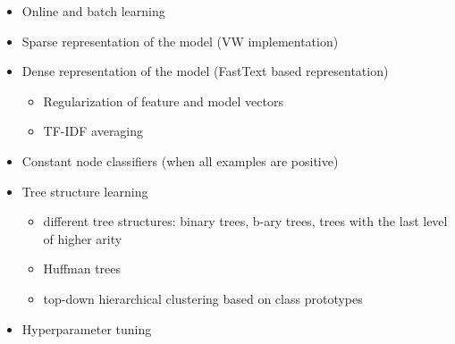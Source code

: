 \documentclass{article}
\newcommand{\Algo}[1]{\textsc{#1}}
\newcommand{\calW}{\mathcal{W}}
\newcommand\R{\mathbb{R}}   %
\begin{document}
\begin{itemize}
\item Online and batch learning
\item Sparse representation of the model (VW implementation)
\item Dense representation of the model (FastText based representation)
\begin{itemize}
    \item Regularization of feature and model vectors
    \item TF-IDF averaging
\end{itemize}
\item Constant node classifiers (when all examples are positive)
\item Tree structure learning
\begin{itemize}
    \item different tree structures: binary trees, b-ary trees, trees with the last level of higher arity 
    \item Huffman trees
    \item top-down hierarchical clustering based on class prototypes
\end{itemize}
\item Hyperparameter tuning 
\end{itemize}




  

\end{document}
